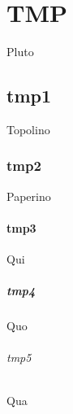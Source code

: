 \chapter*{TMP}
\label{tmp}
Pluto
\section{tmp1}
Topolino
\subsection{tmp2}
Paperino
\subsubsection{tmp3}
Qui
\paragraph{tmp4}
Quo
\subparagraph{tmp5}
Qua




